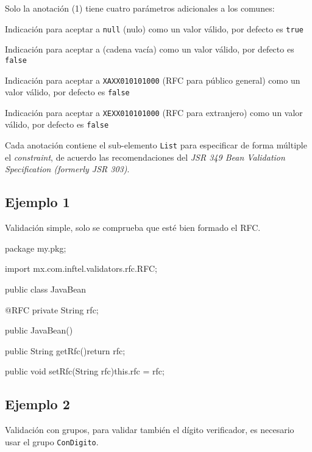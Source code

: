 \documentclass[12pt,letterpaper]{article}
\begin{document}
Solo la anotación (1) tiene cuatro parámetros adicionales a los comunes:

\begin{description}[noitemsep]
\item[isNullValueValid] Indicación para aceptar a \texttt{null} (nulo) como un valor válido, por defecto
    es \texttt{true}
\item[isEmptyValueValid] Indicación para aceptar a \texttt{\textquotedbl\textquotedbl} (cadena vacía) como un valor
    válido, por defecto es \texttt{false}
\item[isXAXX010101000ValueValid] Indicación para aceptar a \texttt{\textquotedbl{}XAXX010101000\textquotedbl}
    (RFC para público general) como un valor válido, por defecto es \texttt{false}
\item[isXEXX010101000ValueValid] Indicación para aceptar a \texttt{\textquotedbl{}XEXX010101000\textquotedbl}
    (RFC para extranjero) como un valor válido, por defecto es \texttt{false}
\end{description}

Cada anotación contiene el sub-elemento \texttt{List} para especificar de forma múltiple el \emph{constraint}, de
acuerdo las recomendaciones del \emph{JSR 349 Bean Validation Specification (formerly JSR 303)}.

\subsection{Ejemplo 1}

Validación simple, solo se comprueba que esté bien formado el RFC.

\begin{listing}{1}
package my.pkg;

import mx.com.inftel.validators.rfc.RFC;

public class JavaBean{

    @RFC
    private String rfc;

    public JavaBean(){}

    public String getRfc(){return rfc;}

    public void setRfc(String rfc){this.rfc = rfc;}
}
\end{listing}

\subsection{Ejemplo 2}

Validación con grupos, para validar también el dígito verificador, es necesario usar el grupo \texttt{ConDigito}.
\end{document}
